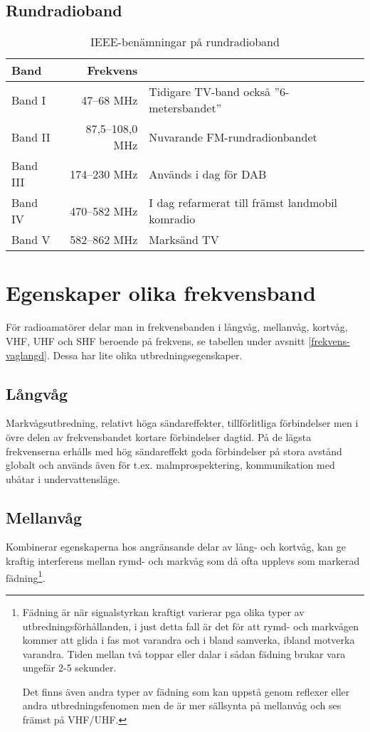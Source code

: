\subsection{Rundradioband}

\begin{table}[H]
	\centering
	\begin{tabular}{lrl}
		\textbf{Band} & \textbf{Frekvens} &                                                 \\ \hline
		Band I        &        47--68 MHz & Tidigare TV-band också ''6-metersbandet''       \\
		Band II       &   87,5--108,0 MHz & Nuvarande FM-rundradionbandet                   \\
		Band III      &      174--230 MHz & Används i dag för DAB                           \\
		Band IV       &      470--582 MHz & I dag refarmerat till främst landmobil komradio \\
		Band V        &      582--862 MHz & Marksänd TV
	\end{tabular}
	\caption{IEEE-benämningar på rundradioband}
\end{table}


\section{Egenskaper olika frekvensband}

För radioamatörer delar man in frekvensbanden i långvåg, mellanvåg, kortvåg,
VHF, UHF och SHF beroende på frekvens, se tabellen under avsnitt
\ref{frekvens-vaglangd}. Dessa har lite olika utbredningsegenskaper.

\subsection{Långvåg}

Markvågsutbredning, relativt höga sändareffekter, tillförlitliga
för\-bind\-el\-ser men i övre delen av frekvensbandet kortare förbindelser
dagtid. På de lägsta frekvenserna erhålls med hög sändareffekt goda förbindelser
på stora avstånd globalt och används även för t.ex. malmprospektering,
kommunikation med ubåtar i undervattensläge.

\subsection{Mellanvåg}

Kombinerar egenskaperna hos angränsande delar av lång- och kortvåg, kan ge
kraftig interferens mellan rymd- och markvåg som då ofta upplevs som markerad
fädning\footnote{Fädning är när signalstyrkan kraftigt varierar pga olika
typer av utbredningsförhållanden, i just detta fall är det för att rymd- och
markvågen kommer att glida i fas mot varandra och i bland samverka, ibland
motverka varandra. Tiden mellan två toppar eller dalar i sådan fädning brukar
vara ungefär 2-5 sekunder.

Det finns även andra typer av fädning som kan uppstå genom reflexer eller
andra utbredningsfenomen men de är mer sällsynta på mellanvåg och ses främst
på VHF/UHF.}.

